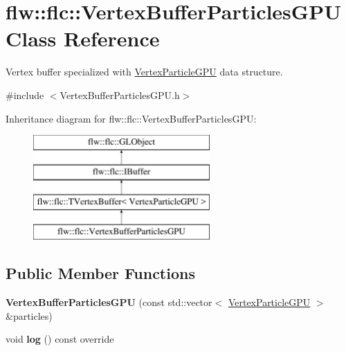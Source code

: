 \hypertarget{classflw_1_1flc_1_1VertexBufferParticlesGPU}{}\section{flw\+:\+:flc\+:\+:Vertex\+Buffer\+Particles\+G\+PU Class Reference}
\label{classflw_1_1flc_1_1VertexBufferParticlesGPU}


Vertex buffer specialized with \hyperlink{structflw_1_1flc_1_1VertexParticleGPU}{Vertex\+Particle\+G\+PU} data structure.  




{\ttfamily \#include $<$Vertex\+Buffer\+Particles\+G\+P\+U.\+h$>$}

Inheritance diagram for flw\+:\+:flc\+:\+:Vertex\+Buffer\+Particles\+G\+PU\+:\begin{figure}[H]
\begin{center}
\leavevmode
\includegraphics[height=4.000000cm]{classflw_1_1flc_1_1VertexBufferParticlesGPU}
\end{center}
\end{figure}
\subsection*{Public Member Functions}
\begin{DoxyCompactItemize}
\item 
{\bfseries Vertex\+Buffer\+Particles\+G\+PU} (const std\+::vector$<$ \hyperlink{structflw_1_1flc_1_1VertexParticleGPU}{Vertex\+Particle\+G\+PU} $>$ \&particles)\hypertarget{classflw_1_1flc_1_1VertexBufferParticlesGPU_a44d4c2566fb3b24c384349459b5501ff}{}\label{classflw_1_1flc_1_1VertexBufferParticlesGPU_a44d4c2566fb3b24c384349459b5501ff}

\item 
void {\bfseries log} () const override\hypertarget{classflw_1_1flc_1_1VertexBufferParticlesGPU_a01750a1530713cb75bb1267977068c6a}{}\label{classflw_1_1flc_1_1VertexBufferParticlesGPU_a01750a1530713cb75bb1267977068c6a}

\end{DoxyCompactItemize}
